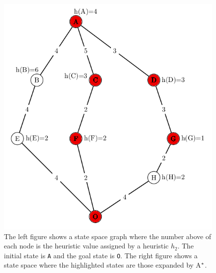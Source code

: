 \begin{figure}[!htb]
  \includegraphics[width=\linewidth]{images/marvinh2fulladgcfG-right}
\endminipage
\caption{The left figure shows a state space graph where the number above of each node is the heuristic value assigned by a heuristic $h_{2}$. The initial state is \texttt{A} and the goal state is \texttt{O}. The right figure shows a state space where the highlighted states are those expanded by A$\sp{*}$.}\label{fig:image_h2_astar}
\end{figure}


